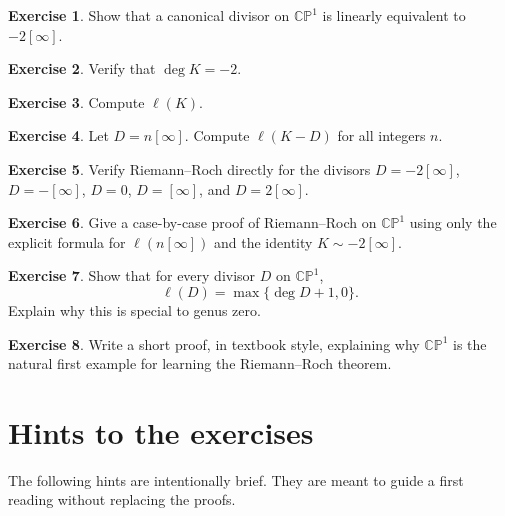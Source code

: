 \documentclass[11pt]{article}
\newcommand{\CP}{\mathbb{CP}}
\newcommand{\degd}{\operatorname{deg}}
\newcommand{\CPone}{\CP^1}
\newcommand{\ellD}{\ell}
\theoremstyle{plain}
\theoremstyle{definition}
\newtheorem{exercise}{Exercise}
\begin{document}
\begin{exercise}
Show that a canonical divisor on $\CPone$ is linearly equivalent to $-2[\infty]$.
\end{exercise}

\begin{exercise}
Verify that $\degd K=-2$.
\end{exercise}

\begin{exercise}
Compute $\ellD(K)$.
\end{exercise}

\begin{exercise}
Let $D=n[\infty]$. Compute $\ellD(K-D)$ for all integers $n$.
\end{exercise}

\begin{exercise}
Verify Riemann--Roch directly for the divisors $D=-2[\infty]$, $D=-[\infty]$, $D=0$, $D=[\infty]$, and $D=2[\infty]$.
\end{exercise}

\begin{exercise}
Give a case-by-case proof of Riemann--Roch on $\CPone$ using only the explicit formula for $\ellD(n[\infty])$ and the identity $K\sim -2[\infty]$.
\end{exercise}

\begin{exercise}
Show that for every divisor $D$ on $\CPone$,
\[
\ellD(D)=\max\{\degd D+1,0\}.
\]
Explain why this is special to genus zero.
\end{exercise}

\begin{exercise}
Write a short proof, in textbook style, explaining why $\CPone$ is the natural first example for learning the Riemann--Roch theorem.
\end{exercise}

\section{Hints to the exercises}
The following hints are intentionally brief. They are meant to guide a first reading without replacing the proofs.
\end{document}
